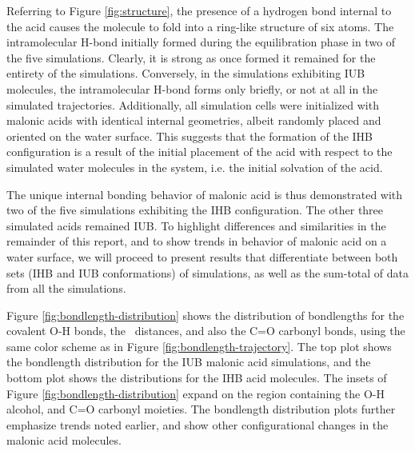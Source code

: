 Referring to Figure \ref{fig:structure}, the presence of a hydrogen bond internal to the acid causes the molecule to fold into a ring-like structure of six atoms. The intramolecular H-bond initially formed during the equilibration phase in two of the five simulations. Clearly, it is strong as once formed it remained for the entirety of the simulations. Conversely, in the simulations exhibiting IUB molecules, the intramolecular H-bond forms only briefly, or not at all in the simulated trajectories. Additionally, all simulation cells were initialized with malonic acids with identical internal geometries, albeit randomly placed and oriented on the water surface. This suggests that the formation of the IHB configuration is a result of the initial placement of the acid with respect to the simulated water molecules in the system, i.e. the initial solvation of the acid.

The unique internal bonding behavior of malonic acid is thus demonstrated with two of the five simulations exhibiting the IHB configuration. The other three simulated acids remained IUB. To highlight differences and similarities in the remainder of this report, and to show trends in behavior of malonic acid on a water surface, we will proceed to present results that differentiate between both sets (IHB and IUB conformations) of simulations, as well as the sum-total of data from all the simulations.  

Figure \ref{fig:bondlength-distribution} shows the distribution of bondlengths for the covalent O-H bonds, the \ocarbh~distances, and also the C=O carbonyl bonds, using the same color scheme as in Figure \ref{fig:bondlength-trajectory}. The top plot shows the bondlength distribution for the IUB malonic acid simulations, and the bottom plot shows the distributions for the IHB acid molecules. The insets of Figure \ref{fig:bondlength-distribution} expand on the region containing the O-H alcohol, and C=O carbonyl moieties. The bondlength distribution plots further emphasize trends noted earlier, and show other configurational changes in the malonic acid molecules.

